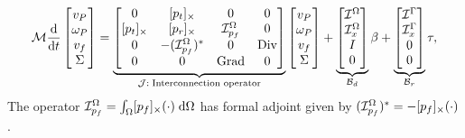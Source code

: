 \begin{equation}
\label{eq:ph_mfd}
\mathcal{M}
\diff{}{t}
\begin{bmatrix}
v_P \\ \omega_P  \\ v_f  \\ \Sigma \\
\end{bmatrix} = 
\underbrace{\begin{bmatrix}
0 & \crmat{p_t} & 0 & 0 \\
\crmat{p_t} & \crmat{p_r} & \mathcal{I}_{p_f}^\Omega & 0 \\
0 & -(\mathcal{I}_{p_f}^\Omega)^* & 0 & \Div \\
0 & 0 & \Grad & 0 \\
\end{bmatrix}}_{\mathcal{J}: \; \text{Interconnection operator}}
\begin{bmatrix}
v_P \\ \omega_P  \\ v_f  \\ \Sigma \\
\end{bmatrix} + 
\underbrace{\begin{bmatrix}
\mathcal{I}^\Omega \\
\mathcal{I}_{x}^\Omega \\
I \\
0 \\
\end{bmatrix}}_{\mathcal{B}_d}
\beta + 
\underbrace{\begin{bmatrix}
\mathcal{I}^\Gamma \\
\mathcal{I}_{x}^\Gamma \\
0 \\
0 \\
\end{bmatrix}}_{\mathcal{B}_r} \tau,
\end{equation}
The operator $\mathcal{I}_{p_f}^\Omega = \int_\Omega \crmat{p_f}(\cdot) \d{\Omega}$ has formal adjoint  given by $(\mathcal{I}_{p_f}^\Omega)^* = - [p_f]_{\times}(\cdot)$.\\

